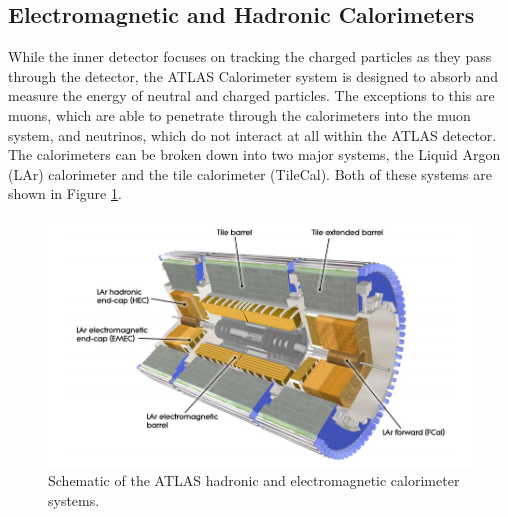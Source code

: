\subsection{Electromagnetic and Hadronic Calorimeters}
\label{sec:EMHCal}
While the inner detector focuses on tracking the charged particles as they pass through the detector, the ATLAS Calorimeter system is designed to absorb and measure the energy of neutral and charged particles.  The exceptions to this are muons, which are able to penetrate through the calorimeters into the muon system, and neutrinos, which do not interact at all within the ATLAS detector.  The calorimeters can be broken down into two major systems, the Liquid Argon (LAr) calorimeter\cite{CERN-LHCC-96-041} and the tile calorimeter (TileCal)\cite{CERN-LHCC-96-042}.  Both of these systems are shown in Figure \ref{fig:ATLASCaloSys}.

\begin{figure}[ht!]
	\centering
	\includegraphics[width=\columnwidth]{../ThesisImages/LHCImages/ATLASCaloSystem.png}
	\caption[Schematic of the ATLAS hadronic and electromagnetic calorimeter systems.]{Schematic of the ATLAS hadronic and electromagnetic calorimeter systems\cite{ATLAS}.
	}
	\label{fig:ATLASCaloSys}
\end{figure}

